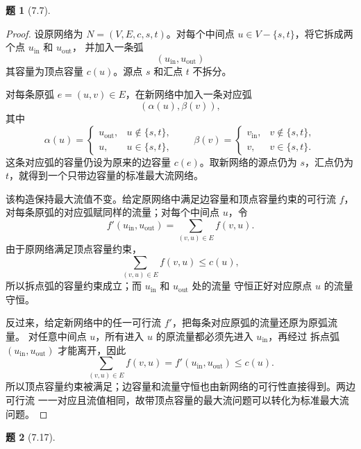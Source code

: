\documentclass[11pt, a4paper]{article}
\newtheorem{problem}{题}
\begin{document}
\vspace{1em}

\begin{problem}[7.7]
\end{problem}

\begin{proof}
    设原网络为 $N=(V,E,c,s,t)$。对每个中间点
    $u\in V-\{s,t\}$，将它拆成两个点 $u_{\mathrm{in}}$ 和 $u_{\mathrm{out}}$，
    并加入一条弧
    \[
        (u_{\mathrm{in}},u_{\mathrm{out}})
    \]
    其容量为顶点容量 $c(u)$。源点 $s$ 和汇点 $t$ 不拆分。

    对每条原弧 $e=(u,v)\in E$，在新网络中加入一条对应弧
    \[
        (\alpha(u),\beta(v)),
    \]
    其中
    \[
        \alpha(u)=
        \begin{cases}
            u_{\mathrm{out}}, & u\notin\{s,t\},\\
            u, & u\in\{s,t\},
        \end{cases}
        \qquad
        \beta(v)=
        \begin{cases}
            v_{\mathrm{in}}, & v\notin\{s,t\},\\
            v, & v\in\{s,t\}.
        \end{cases}
    \]
    这条对应弧的容量仍设为原来的边容量 $c(e)$。取新网络的源点仍为 $s$，汇点仍为
    $t$，就得到一个只带边容量的标准最大流网络。

    该构造保持最大流值不变。给定原网络中满足边容量和顶点容量约束的可行流 $f$，
    对每条原弧的对应弧赋同样的流量；对每个中间点 $u$，令
    \[
        f'(u_{\mathrm{in}},u_{\mathrm{out}})
        =\sum_{(v,u)\in E} f(v,u).
    \]
    由于原网络满足顶点容量约束，
    \[
        \sum_{(v,u)\in E} f(v,u)\le c(u),
    \]
    所以拆点弧的容量约束成立；而 $u_{\mathrm{in}}$ 和 $u_{\mathrm{out}}$ 处的流量
    守恒正好对应原点 $u$ 的流量守恒。

    反过来，给定新网络中的任一可行流 $f'$，把每条对应原弧的流量还原为原弧流量。
    对任意中间点 $u$，所有进入 $u$ 的原流量都必须先进入 $u_{\mathrm{in}}$，再经过
    拆点弧 $(u_{\mathrm{in}},u_{\mathrm{out}})$ 才能离开，因此
    \[
        \sum_{(v,u)\in E} f(v,u)
        = f'(u_{\mathrm{in}},u_{\mathrm{out}})
        \le c(u).
    \]
    所以顶点容量约束被满足；边容量和流量守恒也由新网络的可行性直接得到。两边可行流
    一一对应且流值相同，故带顶点容量的最大流问题可以转化为标准最大流问题。
\end{proof}

\vspace{1em}

\begin{problem}[7.17]
\end{problem}
\end{document}

